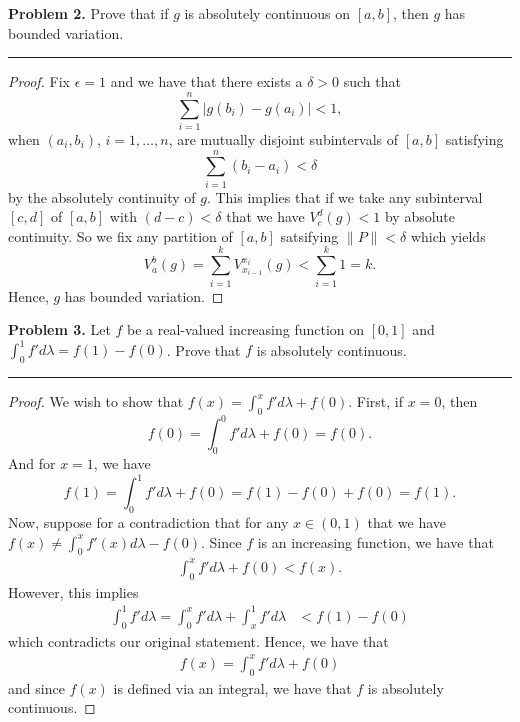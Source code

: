 \documentclass[leqno]{article}
\theoremstyle{nonumberplain}
\newtheorem{proof}{Proof}
\begin{document}
\pagebreak



\noindent\textbf{Problem 2.} \quad
Prove that if $g$ is absolutely continuous on $[a,b]$, then $g$ has bounded variation.

\noindent\rule[0.5ex]{\linewidth}{1pt}


\begin{proof}
Fix $\epsilon =1$ and we have that there exists a $\delta>0$ such that 
\[
\sum_{i=1}^n |g(b_i)-g(a_i)|<1,
\]
when $(a_i,b_i)$, $i=1,\dots,n$, are mutually disjoint subintervals of $[a,b]$ satisfying
\[
\sum_{i=1}^n (b_i-a_i)<\delta
\]
by the absolutely continuity of $g$.  This implies that if we take any subinterval $[c,d]$ of $[a,b]$ with $(d-c)<\delta$ that we have $V_c^d(g)< 1$ by absolute continuity. So we fix any partition of $[a,b]$ satsifying $\|P\|<\delta$ which yields
\[
V_a^b(g)=\sum_{i=1}^k V_{x_{i-1}}^{x_i} (g)< \sum_{i=1}^k 1=k.
\]
Hence, $g$ has bounded variation.
\end{proof}


\pagebreak


\noindent\textbf{Problem 3.} \quad
Let $f$ be a real-valued increasing function on $[0,1]$ and $\int_0^1 f'd\lambda = f(1)-f(0)$. Prove that $f$ is absolutely continuous.

\noindent\rule[0.5ex]{\linewidth}{1pt}

\begin{proof}
We wish to show that $f(x)=\int_0^x f' d\lambda + f(0)$. First, if $x=0$, then
\[
f(0)=\int_0^0 f'd\lambda + f(0) = f(0).
\]
And for $x=1$, we have
\[
f(1)=\int_0^1 f'  d\lambda +f(0)= f(1)-f(0)+f(0)=f(1).
\]
Now, suppose for a contradiction that for any $x\in (0,1)$ that we have $f(x)\neq \int_0^x f'(x)d\lambda - f(0)$. Since $f$ is an increasing function, we have that
\begin{align*}
\int_0^x f' d\lambda +f(0)<f(x). 
\end{align*}
However, this implies
\begin{align*}
\int_0^1 f'd\lambda = \int_0^x f' d\lambda + \int_x^1 f' d\lambda &< f(1)-f(0)
\end{align*}
which contradicts our original statement. Hence, we have that
\begin{align*}
f(x)=\int_0^x f'd\lambda +f(0)
\end{align*}
and since $f(x)$ is defined via an integral, we have that $f$ is absolutely continuous.
\end{proof}
\end{document}
